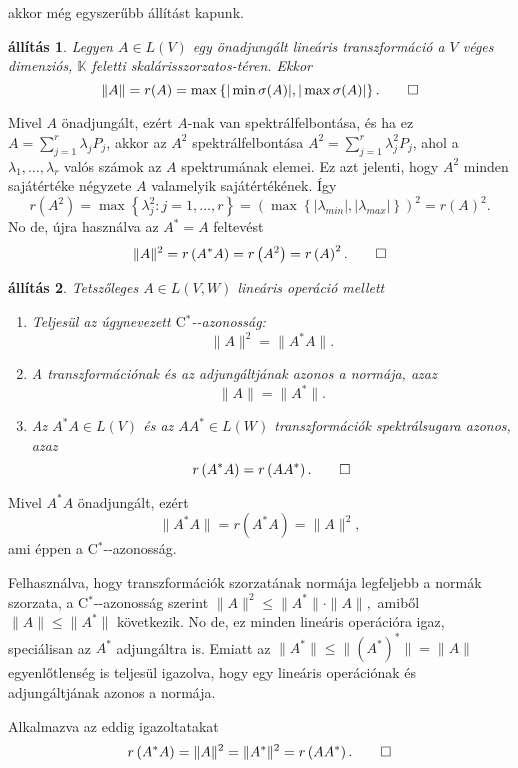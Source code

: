 \documentclass[a4paper, showtrims]{memoir}
\makeatletter
\renewenvironment{proof}[1][\proofname]
    {\par\pushQED{\qed}%
    \normalfont \topsep6\p@\@plus6\p@\relax
    \trivlist
    \item[\hskip\labelsep
        \itshape
    #1\@addpunct{:}]\ignorespaces}
    {\popQED\endtrivlist\@endpefalse}
\theoremstyle{plain}
\newtheorem{proposition}{állítás}[chapter]
\theoremstyle{remark}
\theoremstyle{definition}
\newcommand{\Star}[1]{#1\ensuremath{^*}\kern-\scriptspace}
\newcommand{\CStar}{\Star{\ensuremath{\mathrm{C}}}}
\makeatother
\begin{document}
akkor még egyszerűbb állítást kapunk.
\begin{proposition}
	Legyen $A\in L\left( V \right)$ egy önadjungált lineáris transzformáció a
	$V$ véges dimenziós, $\mathbb{K}$ feletti ska\-lá\-ris\-szor\-za\-tos-té\-ren.
	Ekkor
	\[
		\|A\|
		=
		r(A)
		=
		\max\left\{ |\min\sigma(A)|,|\max\sigma(A)| \right\}.
		\qedhere
	\]
\end{proposition}
\begin{proof}
	Mivel $A$ önadjungált,
	ezért $A$-nak van spektrálfelbontása, és ha ez $A=\sum_{j=1}^r\lambda_jP_j$,
	akkor az $A^2$ spektrálfelbontása $A^2=\sum_{j=1}^r\lambda_j^2P_j$,
	ahol a $\lambda_1,\ldots,\lambda_r$ valós számok az $A$ spektrumának elemei.
	Ez azt jelenti, hogy $A^2$ minden sajátértéke négyzete $A$ valamelyik sajátértékének.
	Így
	\[
		r\left( A^2 \right)
		=
		\max\left\{ \lambda_j^2:j=1,\ldots,r \right\}
		=
		\left(
		\max\left\{ |\lambda_{min}|,|\lambda_{max}| \right\}
		\right)^2
		=
		r\left( A \right)^2.
	\]
	No de, újra használva az $A^\ast=A$ feltevést
	\[
		\|A\|^2
		=
		r\left( A^\ast A \right)
		=
		r\left( A^2 \right)
		=
		r\left( A \right)^2.
		\qedhere
	\]
\end{proof}
\begin{proposition}
	Tetszőleges $A\in L\left( V,W \right)$ lineáris operáció mellett
	\begin{enumerate}
		\item Teljesül az úgynevezett
		      \emph{\CStar-azonosság}\index{Ccsillag@\CStar-azonosság}:
		      \[
			      \|A\|^2=\|A^\ast A\|.
		      \]
		\item A transzformációnak és az adjungáltjának azonos a normája, azaz
		      \[
			      \|A\|
			      =
			      \|A^\ast\|.
		      \]
		\item Az $A^\ast A\in L\left( V \right)$ és az $AA^\ast\in L\left( W \right)$
		      transzformációk spektrálsugara azonos, azaz
		      \[
			      r\left( A^\ast A \right)=r\left( AA^\ast \right).
			      \qedhere
		      \]
	\end{enumerate}
\end{proposition}
\begin{proof}
	Mivel $A^\ast A$ önadjungált, ezért
	\[
		\|A^\ast A\|=r\left(A^\ast A  \right)=\|A\|^2,
	\]
	ami éppen a \CStar-azonosság.

	Felhasználva, hogy transzformációk szorzatának normája legfeljebb a normák szorzata,
	a \CStar-azonosság szerint
	\begin{math}
		\|A\|^2
		\leq
		\|A^\ast\|\cdot\|A\|,
	\end{math}
	amiből $\|A\|\leq\|A^\ast\|$ következik.
	No de, ez minden lineáris operációra igaz,
	speciálisan az $A^\ast$ adjungáltra is.
	Emiatt az
	\begin{math}
		\|A^\ast\|
		\leq
		\|(A^\ast)^\ast\|
		=
		\|A\|
	\end{math}
	egyenlőtlenség is teljesül igazolva,
	hogy egy lineáris operációnak és adjungáltjának azonos a normája.

	Alkalmazva az eddig igazoltatakat
	\[
		r\left( A^\ast A \right)
		=
		\|A\|^2
		=
		\|A^\ast\|^2
		=
		r\left( AA^\ast \right).
		\qedhere
	\]
\end{proof}
\end{document}
